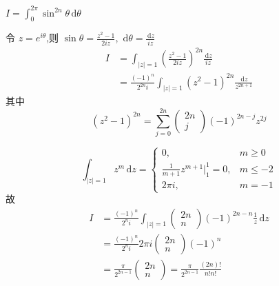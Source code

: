 \documentclass[../../复变函数.tex]{subfiles}
\begin{document}
\begin{example}
    \(  I =  \int_{0}^{2\pi }\sin ^{2n} \theta \,\mathrm{d}  \theta   \) 
\end{example}
\begin{solution}
    令 \(  z= e^{i \theta }  \),则 \(  \sin  \theta = \frac{z^{2}-1 }{2iz }   \), \(  \,\mathrm{d}  \theta = \frac{\,\mathrm{d} z }{iz }   \)   \[
    \begin{aligned}
        I&= \int_{\left| z \right|= 1 }\left( \frac{z^{2}-1 }{2iz }  \right)^{2n}\frac{\,\mathrm{d} z }{iz }   \\ 
         & = \frac{\left( -1 \right)^{n}  }{2^{2n}i }\int_{\left| z \right|= 1 } \left( z^{2}-1 \right)^{2n}\frac{\,\mathrm{d} z }{z^{2n+ 1} }  
    \end{aligned}
    \]其中 \[
    \left( z^{2}-1 \right)^{2n}= \sum _{j= 0}^{2n}\begin{pmatrix} 
        2n\\ 
         j 
    \end{pmatrix}\left( -1 \right)^{2n-j}z^{2j}   
    \]
\end{solution}
\[
\int_{\left| z \right|= 1 }z^{m}\,\mathrm{d} z= \begin{cases} 0,&m\ge 0\\ 
 \frac{1}{m+ 1}z^{m+ 1}|_{1}^{1}= 0,&m\le -2\\ 
   2\pi i,&m= -1\end{cases} 
\]故 \[
\begin{aligned}
    I &=  \frac{\left( -1 \right)^{n}  }{2^{n}i }\int_{\left| z \right|= 1 }\begin{pmatrix} 
        2n\\ 
         n 
    \end{pmatrix}\left( -1 \right)^{2n-n}\frac{1 }{z }\,\mathrm{d} z\\ 
     & =  \frac{\left( -1 \right)^{n}  }{2^{n}i }2\pi i \begin{pmatrix} 
         2n\\ 
          n 
     \end{pmatrix}\left( -1 \right)^{n}\\ 
      & = \frac{\pi  }{2^{2n-1} }\begin{pmatrix} 
          2n\\ 
           n 
      \end{pmatrix}=  \frac{\pi  }{2^{2n-1} }\frac{\left( 2n \right)!  }{n!n! }      
\end{aligned}    
\]
\hspace*{\fill} 
\end{document}
